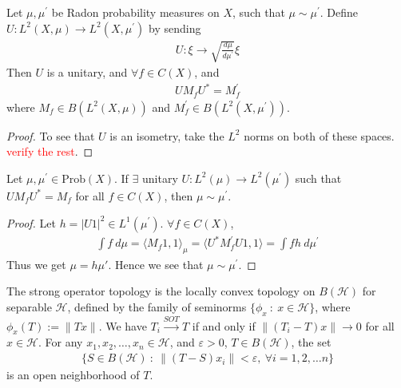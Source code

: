 

\begin{lemma}
  Let $\mu, \mu^\prime$ be Radon probability measures on $X$, such
  that $ \mu \sim \mu^\prime$. Define $U: L^{2}(X, \mu) \to L^{2}(X,
  \mu^\prime)$ by sending
  \begin{align*}
    U : \xi \to \sqrt{\frac{d\mu}{d \mu^\prime}} \xi
  \end{align*}
  Then $U$ is a unitary, and $\forall f \in C(X)$, and
  \begin{align*}
    UM_fU^* = M^\prime_f
  \end{align*}
  where $M_f \in B(L^{2}(X, \mu))$ and $M_f^\prime \in B(L^{2}(X, \mu^\prime))$.
\end{lemma}
\begin{proof}
  To see that $U$ is an isometry, take the $L^{2}$ norms on both of
  these spaces. \textcolor{red}{verify the rest}.
\end{proof}

\begin{lemma}
  Let $\mu, \mu^\prime \in \textrm{Prob}(X)$. If $\exists$ unitary
  $U: L^{2}(\mu) \to L^{2}(\mu^\prime)$ such that $UM_fU^* = M_f$ for
  all $f \in C(X)$, then $\mu \sim \mu^\prime$.
\end{lemma}
\begin{proof}
  Let $h = |U 1|^2 \in L^{1}(\mu^\prime)$. $\forall f \in C(X)$,
  \begin{align*}
    \int f \ d \mu = \langle M_f 1 , 1 \rangle_{\mu} = \langle
    U^*M_f^\prime U 1 , 1 \rangle = \int f h \ d \mu^\prime
  \end{align*}
  Thus we get $\mu = h \mu'$. Hence we see that $\mu \sim \mu^\prime$.
\end{proof}

\begin{definition}
  The strong operator topology is the locally convex topology on
  $B(\mathcal{H})$ for separable $\mathcal{H}$, defined by the family
  of seminorms $\{ \phi_x  \ : \  x \in \mathcal{H} \}$, where
  $\phi_x(T) := \|T x\|$.
  We have $T_i \stackrel{SOT}{\to} T$ if and only if $\|(T_i - T) x\|
  \to 0$ for all $x \in \mathcal{H}$.
  For any $x_1 , x_2 , \ldots , x_n \in \mathcal{H}$, and
  $\varepsilon > 0$, $T \in B(\mathcal{H})$, the set
  \begin{align*}
    \{  S \in B(\mathcal{H})  \ : \    \|(T - S) x_i\| < \varepsilon,
    \ \forall i = 1,2, \ldots n \}
  \end{align*}
  is an open neighborhood of $T$.
\end{definition}

